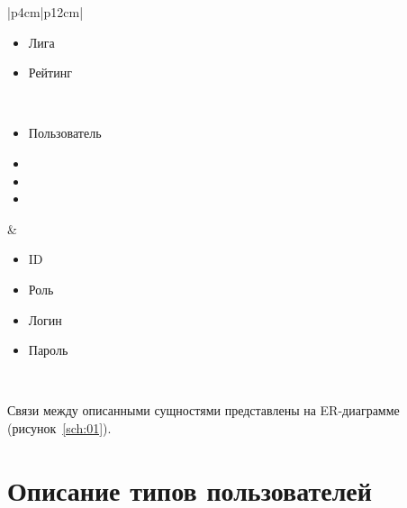 \begin{table}[h!]
\begin{center}
\begin{threeparttable}
\begin{tabular}{|p{4cm}|p{12cm}|}
\begin{minipage}[t]{\linewidth}
\begin{multicols}{2}
\begin{itemize}[leftmargin=0mm,labelsep=0mm,nosep,after=\strut]
                  \item[] Лига
                  \item[] Рейтинг
                \end{itemize}
              \end{multicols}
            \end{minipage}\\
            \hline
            \begin{minipage}[t]{\linewidth}
              \begin{multicols}{0}
                \begin{itemize}[leftmargin=0mm,labelsep=0mm,nosep,after=\strut]
                  \item[] Пользователь
                  \item[]
                  \item[]
                  \item[]
                \end{itemize}
              \end{multicols}
            \end{minipage}
          & \begin{minipage}[t]{\linewidth}
              \begin{multicols}{2}
                \begin{itemize}[leftmargin=0mm,labelsep=0mm,nosep,after=\strut]
                  \item[] ID
                  \item[] Роль
                  \item[] Логин
                  \item[] Пароль
                \end{itemize}
              \end{multicols}
            \end{minipage}\\
           \hline
        \end{tabular}
    \end{threeparttable}
    \end{center}
\end{table} 

Связи между описанными сущностями представлены на ER-диаграмме
(рисунок~\ref{sch:01}).


\section{Описание типов пользователей}

